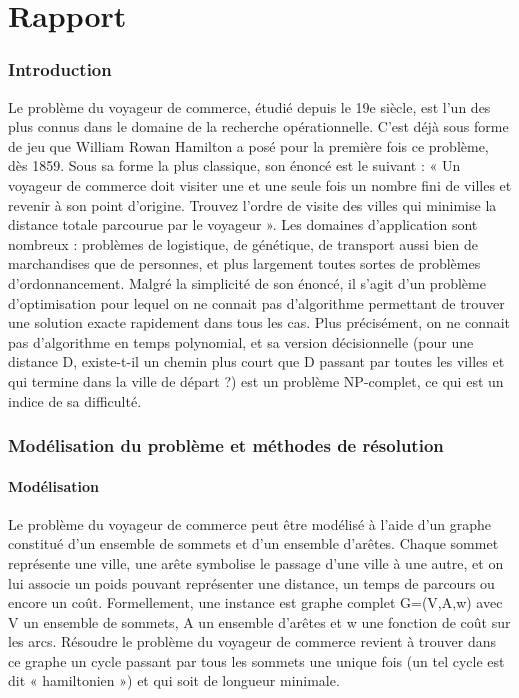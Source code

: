 \documentclass[12pt, openany]{report}
\begin{document}
\part{Rapport}
\setlength{\parindent}{1cm}\section{Introduction}
Le problème du voyageur de commerce, étudié depuis le 19e siècle, est l’un des plus connus dans le domaine de la recherche opérationnelle. C’est déjà sous forme de jeu que William Rowan Hamilton a posé pour la première fois ce problème, dès 1859. Sous sa forme la plus classique, son énoncé est le suivant : « Un voyageur de commerce doit visiter une et une seule fois un nombre fini de villes et revenir à son point d’origine. Trouvez l’ordre de visite des villes qui minimise la distance totale parcourue par le voyageur ». Les domaines d’application sont nombreux : problèmes de logistique, de génétique, de transport aussi bien de marchandises que de personnes, et plus largement toutes sortes de problèmes d’ordonnancement.
Malgré la simplicité de son énoncé, il s'agit d'un problème d'optimisation pour lequel on ne connait pas d'algorithme permettant de trouver une solution exacte rapidement dans tous les cas. Plus précisément, on ne connait pas d'algorithme en temps polynomial, et sa version décisionnelle (pour une distance D, existe-t-il un chemin plus court que D passant par toutes les villes et qui termine dans la ville de départ ?) est un problème NP-complet, ce qui est un indice de sa difficulté.
\setlength{\parindent}{1cm}\section{Modélisation du problème et méthodes de résolution}
\setlength{\parindent}{1cm}\subsection{Modélisation}
Le problème du voyageur de commerce peut être modélisé à l’aide d’un graphe constitué d’un ensemble de sommets et d’un ensemble d’arêtes. Chaque sommet représente une ville, une arête symbolise le passage d’une ville à une autre, et on lui associe un poids pouvant représenter une distance, un temps de parcours ou encore un coût. Formellement, une instance est graphe complet G=(V,A,w) avec V un ensemble de sommets, A un ensemble d’arêtes et w une fonction de coût sur les arcs.
Résoudre le problème du voyageur de commerce revient à trouver dans ce graphe un cycle passant par tous les sommets une unique fois (un tel cycle est dit « hamiltonien ») et qui soit de longueur minimale.
\end{document}
